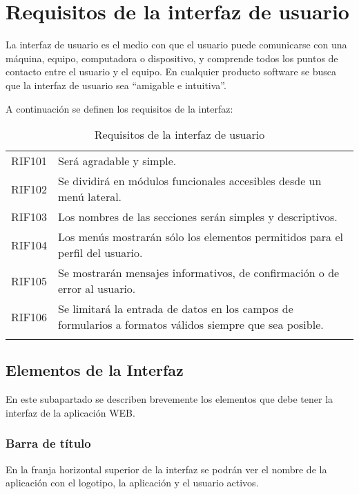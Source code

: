 \renewcommand{\arraystretch}{1} %


\section{Requisitos de la interfaz de usuario}
La interfaz de usuario es el medio con que el usuario puede comunicarse con una máquina, equipo, computadora o dispositivo, y comprende todos los puntos de contacto entre el usuario y el equipo\cite{Interfaz}. En cualquier producto software se busca que la interfaz de usuario sea ``amigable e intuitiva''. 

A continuación se definen los requisitos de la interfaz:

\label{cuadro:requisitos-de-la-interfaz}
\begin{longtable}{l|p{13.7cm}}
  RIF101\label{RIF101} & Será agradable y simple. \\
  RIF102\label{RIF102} & Se dividirá en módulos funcionales accesibles desde un menú lateral. \\
  RIF103\label{RIF103} & Los nombres de las secciones serán simples y descriptivos. \\
  RIF104\label{RIF104} & Los menús mostrarán sólo los elementos permitidos para el perfil del usuario. \\
  RIF105\label{RIF105} & Se mostrarán mensajes informativos, de confirmación o de error al usuario. \\
  RIF106\label{RIF106} & Se limitará la entrada de datos en los campos de formularios a formatos válidos siempre que sea posible. \\
  \caption{Requisitos de la interfaz de usuario} \\
\end{longtable}

\subsection{Elementos de la Interfaz}
En este subapartado se describen brevemente los elementos que debe tener la interfaz de la aplicación WEB. 

\subsubsection*{Barra de título}
En la franja horizontal superior de la interfaz se podrán ver el nombre de la aplicación con el logotipo, la aplicación y el usuario activos.

